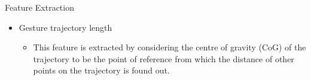 \documentclass{beamer}
\begin{document}
\begin{frame}{Feature Extraction}
\begin{itemize}
\item Gesture trajectory length
\linebreak
\begin{itemize}
\item This feature is extracted by
considering the centre of gravity (CoG) of the trajectory to be
the point of reference from which the distance of other points
on the trajectory is found out.
\linebreak
%
  
\end{itemize}
\end{itemize}
\end{frame}
\end{document}
